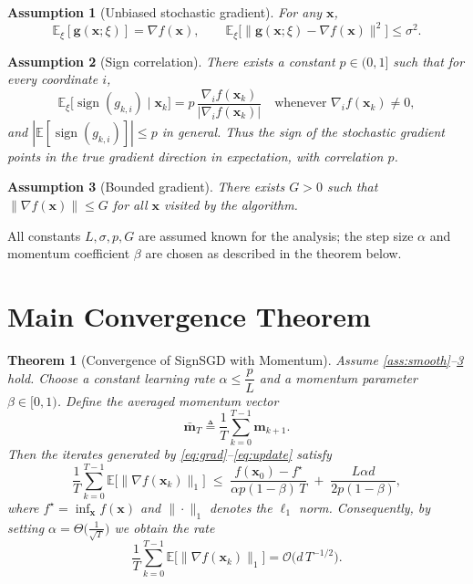 \documentclass{article}
\newtheorem{theorem}{Theorem}
\newtheorem{assumption}{Assumption}
\newcommand{\sgn}{\operatorname{sign}}
\begin{document}
\begin{assumption}[Unbiased stochastic gradient]\label{ass:unbiased}
For any $\mathbf{x}$,
\[
\mathbb{E}_{\xi}[\mathbf{g}(\mathbf{x};\xi)]=\nabla f(\mathbf{x}),\qquad 
\mathbb{E}_{\xi}\big[\|\mathbf{g}(\mathbf{x};\xi)-\nabla f(\mathbf{x})\|^{2}\big]\le\sigma^{2}.
\]
\end{assumption}

\begin{assumption}[Sign correlation]\label{ass:sign}
There exists a constant $p\in(0,1]$ such that for every coordinate $i$,
\[
\mathbb{E}_{\xi}\big[ \sgn(g_{k,i})\;\big|\;\mathbf{x}_{k}\big]
= p\,\frac{\nabla_{i}f(\mathbf{x}_{k})}{|\nabla_{i}f(\mathbf{x}_{k})|}\quad\text{whenever }\nabla_{i}f(\mathbf{x}_{k})\neq0,
\]
and $|\mathbb{E}[\sgn(g_{k,i})]|\le p$ in general.  
Thus the sign of the stochastic gradient points in the true gradient direction in expectation, with correlation $p$.
\end{assumption}

\begin{assumption}[Bounded gradient]\label{ass:bound}
There exists $G>0$ such that $\|\nabla f(\mathbf{x})\|\le G$ for all $\mathbf{x}$ visited by the algorithm.
\end{assumption}

All constants $L,\sigma,p,G$ are assumed known for the analysis; the step size $\alpha$ and momentum coefficient $\beta$ are chosen as described in the theorem below.

\section*{Main Convergence Theorem}
\begin{theorem}[Convergence of SignSGD with Momentum]\label{thm:main}
Assume \ref{ass:smooth}–\ref{ass:bound} hold.  
Choose a constant learning rate $\alpha\le \dfrac{p}{L}$ and a momentum parameter $\beta\in[0,1)$.  
Define the averaged momentum vector
\[
\bar{\mathbf{m}}_{T}\triangleq\frac{1}{T}\sum_{k=0}^{T-1}\mathbf{m}_{k+1}.
\]
Then the iterates generated by \eqref{eq:grad}–\eqref{eq:update} satisfy
\[
\frac{1}{T}\sum_{k=0}^{T-1}\mathbb{E}\big[\|\nabla f(\mathbf{x}_{k})\|_{1}\big]
\;\le\;
\frac{f(\mathbf{x}_{0})-f^{\star}}{\alpha p(1-\beta)\,T}
\;+\;
\frac{L\alpha d}{2p(1-\beta)},
\tag{5}
\]
where $f^{\star}= \inf_{\mathbf{x}}f(\mathbf{x})$ and $\|\cdot\|_{1}$ denotes the $\ell_{1}$ norm.
Consequently, by setting $\alpha=\Theta\!\big(\tfrac{1}{\sqrt{T}}\big)$ we obtain the rate
\[
\frac{1}{T}\sum_{k=0}^{T-1}\mathbb{E}\big[\|\nabla f(\mathbf{x}_{k})\|_{1}\big]=\mathcal{O}\!\big(d\,T^{-1/2}\big).
\]
\end{theorem}
\end{document}
